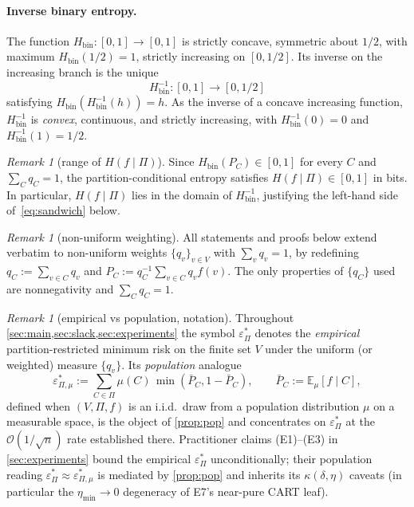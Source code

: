 \documentclass[10pt]{article}
\theoremstyle{definition}
\theoremstyle{remark}
\newtheorem{remark}[theorem]{Remark}
\newcommand{\Hbin}{H_{\mathrm{bin}}}
\newcommand{\Hinv}{H_{\mathrm{bin}}^{-1}}
\newcommand{\eps}{\varepsilon}
\newcommand{\epsP}{\eps^{\!*}_{\Pi}}
\newcommand{\E}{\mathbb{E}}
\begin{document}
\paragraph{Inverse binary entropy.} The function
$\Hbin : [0,1] \to [0,1]$ is strictly concave, symmetric about
$1/2$, with maximum $\Hbin(1/2) = 1$, strictly increasing on
$[0, 1/2]$. Its inverse on the increasing branch is the unique
\[
  \Hinv : [0, 1] \to [0, 1/2]
\]
satisfying $\Hbin(\Hinv(h)) = h$. As the inverse of a concave
increasing function, $\Hinv$ is \emph{convex}, continuous, and
strictly increasing, with $\Hinv(0) = 0$ and $\Hinv(1) = 1/2$.

\begin{remark}[range of $H(f \mid \Pi)$]\label{rem:H-range}
Since $\Hbin(P_{C}) \in [0, 1]$ for every $C$ and
$\sum_{C} q_{C} = 1$, the partition-conditional entropy
satisfies $H(f \mid \Pi) \in [0, 1]$ in bits. In particular,
$H(f \mid \Pi)$ lies in the domain of $\Hinv$, justifying the
left-hand side of~\eqref{eq:sandwich} below.
\end{remark}

\begin{remark}[non-uniform weighting]\label{rem:weights}
All statements and proofs below extend verbatim to non-uniform
weights $\{q_{v}\}_{v \in V}$ with $\sum_{v} q_{v} = 1$, by
redefining $q_{C} := \sum_{v \in C} q_{v}$ and
$P_{C} := q_{C}^{-1} \sum_{v \in C} q_{v} f(v)$. The only
properties of $\{q_{C}\}$ used are nonnegativity and
$\sum_{C} q_{C} = 1$.
\end{remark}

\begin{remark}[empirical vs population, notation]\label{rem:emp-pop}
Throughout \cref{sec:main,sec:slack,sec:experiments} the symbol
$\epsP$ denotes the \emph{empirical} partition-restricted minimum
risk on the finite set $V$ under the uniform (or weighted)
measure $\{q_{v}\}$. Its \emph{population} analogue
\[
  \eps^{*}_{\Pi,\mu}
    := \sum_{C \in \Pi} \mu(C)\,\min(\bar P_{C}, 1 - \bar P_{C}),
  \qquad
  \bar P_{C} := \E_{\mu}[f \mid C],
\]
defined when $(V, \Pi, f)$ is an i.i.d.\ draw from a population
distribution $\mu$ on a measurable space, is the object of
\cref{prop:pop} and concentrates on $\epsP$ at the
$\mathcal O(1/\sqrt n)$ rate established there. Practitioner
claims (E1)--(E3) in \cref{sec:experiments} bound the empirical
$\epsP$ unconditionally; their population reading
$\epsP \approx \eps^{*}_{\Pi,\mu}$ is mediated by
\cref{prop:pop} and inherits its $\kappa(\delta,\eta)$ caveats
(in particular the $\eta_{\min}\to 0$ degeneracy of E7's
near-pure CART leaf).
\end{remark}
\end{document}
